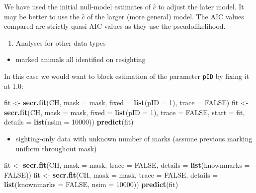 \documentclass[
]{book}
\newenvironment{Shaded}{\begin{snugshade}}{\end{snugshade}}
\newcommand{\AttributeTok}[1]{\textcolor[rgb]{0.13,0.29,0.53}{#1}}
\newcommand{\ConstantTok}[1]{\textcolor[rgb]{0.56,0.35,0.01}{#1}}
\newcommand{\DecValTok}[1]{\textcolor[rgb]{0.00,0.00,0.81}{#1}}
\newcommand{\FunctionTok}[1]{\textcolor[rgb]{0.13,0.29,0.53}{\textbf{#1}}}
\newcommand{\NormalTok}[1]{#1}
\newcommand{\OtherTok}[1]{\textcolor[rgb]{0.56,0.35,0.01}{#1}}
\providecommand{\tightlist}{%
  \setlength{\itemsep}{0pt}\setlength{\parskip}{0pt}}
\begin{document}
We have used the initial null-model estimates of \(\hat c\) to adjust the later model. It may be better to use the \(\hat c\) of the larger (more general) model. The AIC values compared are strictly quasi-AIC values as they use the pseudolikelihood.

\begin{enumerate}
\def\labelenumi{\arabic{enumi}.}
\setcounter{enumi}{8}
\tightlist
\item
  Analyses for other data types
\end{enumerate}

\begin{itemize}
\tightlist
\item
  marked animals all identified on resighting
\end{itemize}

In this case we would want to block estimation of the parameter \texttt{pID} by fixing it at 1.0:

\begin{Shaded}
\begin{Highlighting}[]
\NormalTok{fit }\OtherTok{\textless{}{-}} \FunctionTok{secr.fit}\NormalTok{(CH, }\AttributeTok{mask =}\NormalTok{ mask, }\AttributeTok{fixed =} \FunctionTok{list}\NormalTok{(}\AttributeTok{pID =} \DecValTok{1}\NormalTok{), }\AttributeTok{trace =} \ConstantTok{FALSE}\NormalTok{)}
\NormalTok{fit }\OtherTok{\textless{}{-}} \FunctionTok{secr.fit}\NormalTok{(CH, }\AttributeTok{mask =}\NormalTok{ mask, }\AttributeTok{fixed =} \FunctionTok{list}\NormalTok{(}\AttributeTok{pID =} \DecValTok{1}\NormalTok{), }\AttributeTok{trace =} \ConstantTok{FALSE}\NormalTok{, }
                \AttributeTok{start =}\NormalTok{ fit, }\AttributeTok{details =} \FunctionTok{list}\NormalTok{(}\AttributeTok{nsim =} \DecValTok{10000}\NormalTok{))}
\FunctionTok{predict}\NormalTok{(fit)}
\end{Highlighting}
\end{Shaded}

\begin{itemize}
\tightlist
\item
  sighting-only data with unknown number of marks (assume previous marking uniform throughout mask)
\end{itemize}

\begin{Shaded}
\begin{Highlighting}[]
\NormalTok{fit }\OtherTok{\textless{}{-}} \FunctionTok{secr.fit}\NormalTok{(CH, }\AttributeTok{mask =}\NormalTok{ mask, }\AttributeTok{trace =} \ConstantTok{FALSE}\NormalTok{, }
                \AttributeTok{details =} \FunctionTok{list}\NormalTok{(}\AttributeTok{knownmarks =} \ConstantTok{FALSE}\NormalTok{))}
\NormalTok{fit }\OtherTok{\textless{}{-}} \FunctionTok{secr.fit}\NormalTok{(CH, }\AttributeTok{mask =}\NormalTok{ mask, }\AttributeTok{trace =} \ConstantTok{FALSE}\NormalTok{, }
    \AttributeTok{details =} \FunctionTok{list}\NormalTok{(}\AttributeTok{knownmarks =} \ConstantTok{FALSE}\NormalTok{, }\AttributeTok{nsim =} \DecValTok{10000}\NormalTok{))}
\FunctionTok{predict}\NormalTok{(fit)}
\end{Highlighting}
\end{Shaded}
\end{document}

